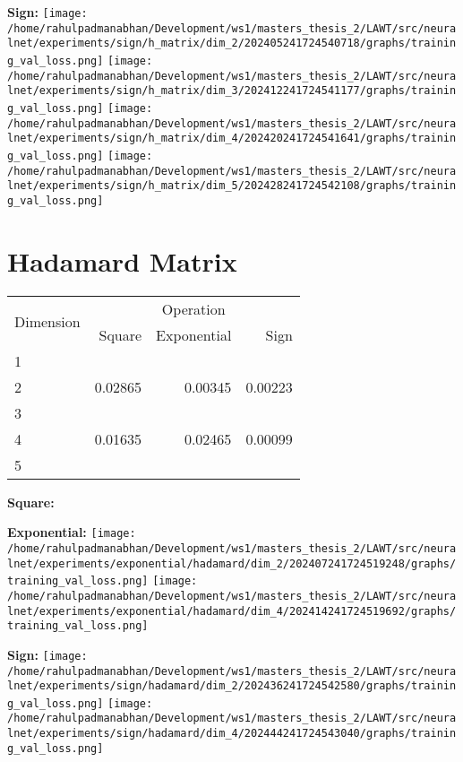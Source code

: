 \documentclass{article}
\begin{document}
\textbf{Sign:}
\texttt{[image: /home/rahulpadmanabhan/Development/ws1/masters\_thesis\_2/LAWT/src/neuralnet/experiments/sign/h\_matrix/dim\_2/202405241724540718/graphs/training\_val\_loss.png]}
\texttt{[image: /home/rahulpadmanabhan/Development/ws1/masters\_thesis\_2/LAWT/src/neuralnet/experiments/sign/h\_matrix/dim\_3/202412241724541177/graphs/training\_val\_loss.png]}
\texttt{[image: /home/rahulpadmanabhan/Development/ws1/masters\_thesis\_2/LAWT/src/neuralnet/experiments/sign/h\_matrix/dim\_4/202420241724541641/graphs/training\_val\_loss.png]}
\texttt{[image: /home/rahulpadmanabhan/Development/ws1/masters\_thesis\_2/LAWT/src/neuralnet/experiments/sign/h\_matrix/dim\_5/202428241724542108/graphs/training\_val\_loss.png]}

\pagebreak
\section{Hadamard Matrix}
\begin{tabular}{@{}lrrr@{}}
\toprule
\multirow{2}{*}{Dimension} & \multicolumn{3}{c}{Operation} \\
\cmidrule(l){2-4}
& Square & Exponential & Sign \\
\midrule
1 & & & \\
2 & 0.02865 & 0.00345 & 0.00223 \\
3 & & & \\
4 & 0.01635 & 0.02465 & 0.00099 \\
5 & & & \\
\bottomrule
\end{tabular}

\textbf{Square:}

\textbf{Exponential:}
\texttt{[image: /home/rahulpadmanabhan/Development/ws1/masters\_thesis\_2/LAWT/src/neuralnet/experiments/exponential/hadamard/dim\_2/202407241724519248/graphs/training\_val\_loss.png]}
\texttt{[image: /home/rahulpadmanabhan/Development/ws1/masters\_thesis\_2/LAWT/src/neuralnet/experiments/exponential/hadamard/dim\_4/202414241724519692/graphs/training\_val\_loss.png]}

\textbf{Sign:}
\texttt{[image: /home/rahulpadmanabhan/Development/ws1/masters\_thesis\_2/LAWT/src/neuralnet/experiments/sign/hadamard/dim\_2/202436241724542580/graphs/training\_val\_loss.png]}
\texttt{[image: /home/rahulpadmanabhan/Development/ws1/masters\_thesis\_2/LAWT/src/neuralnet/experiments/sign/hadamard/dim\_4/202444241724543040/graphs/training\_val\_loss.png]}
\end{document}
